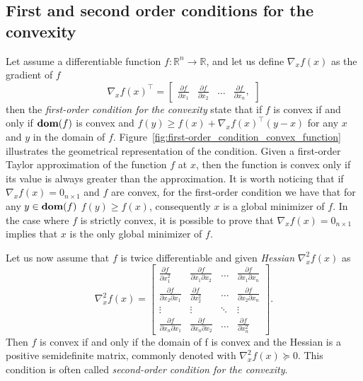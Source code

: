 \subsection{First and second order conditions for the convexity}
Let assume a differentiable function $f: \mathbb{R}^n \rightarrow \mathbb{R}$, and let us define $\nabla_x f(x)$ as the gradient of $f$
\begin{equation}
    \nabla_x f(x)^\top = \begin{bmatrix}
        \frac{\partial f}{\partial x_1} & \frac{\partial f}{\partial x_2}& \hdots & \frac{\partial f}{\partial x_n},
    \end{bmatrix}
\end{equation}
then the \emph{first-order condition for the convexity} state that if $f$ is convex if and only if $\operatorname*{\textbf{dom}}(f)$ is convex and $f(y) \ge f(x) + \nabla_x f(x)^\top (y -x)$ for any $x$ and $y$ in the domain of $f$.
Figure~\ref{fig:first-order_condition_convex_function} illustrates the geometrical representation of the condition. Given a first-order Taylor approximation of the function $f$ at $x$, then the function is convex only if its value is always greater than the approximation. 
It is worth noticing that if $\nabla_x f(x) = 0_{n\times1}$ and $f$ are convex, for the first-order condition we have that for any $y \in \operatorname*{\textbf{dom}}(f)$ $f(y) \ge f(x)$, consequently $x$ is a global minimizer of $f$. In the case where $f$ is strictly convex, it is possible to prove that $\nabla_x f(x) = 0_{n \times 1}$ implies that $x$ is the only global minimizer of $f$.
\par
Let us now assume that $f$ is twice differentiable and given \emph{Hessian} $\nabla^2_x f(x)$ as
\begin{equation}
    \nabla^2_x f(x) = 
    \begin{bmatrix}
        \frac{\partial f}{\partial x_1^2} & \frac{\partial f}{\partial x_1 \partial x_2}& \hdots & \frac{\partial f}{ \partial x_1 \partial x_n} \\ 
         \frac{\partial f}{\partial x_2 \partial x_1} & \frac{\partial f}{\partial x_2^2}& \hdots & \frac{\partial f}{ \partial x_2 \partial x_n} \\
         \vdots & \vdots & \ddots & \vdots \\ 
          \frac{\partial f}{\partial x_n \partial x_1} & \frac{\partial f}{\partial x_n \partial x_2}& \hdots & \frac{\partial f}{\partial x_n ^ 2}
    \end{bmatrix}.
\end{equation}
Then $f$ is convex if and only if the domain of f is convex and the Hessian is a positive semidefinite matrix, commonly denoted with $\nabla^2_x f(x) \succeq 0$. This condition is often called \emph{second-order condition for the convexity}. 
